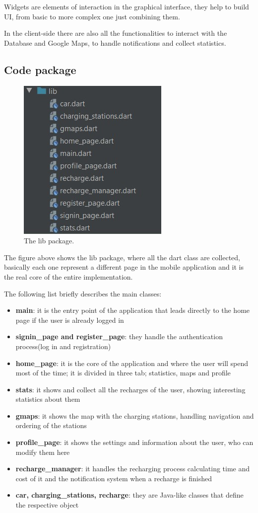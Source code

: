 Widgets are elements of interaction in the graphical interface, they help to build UI, from basic to more complex one just combining them. 

In the client-side there are also all the functionalities to interact with the Database and Google Maps, to handle notifications and collect statistics. 
\subsection{Code package}

\begin{figure}[htpb]
	\centering
	\includegraphics[width=0.4\linewidth]{Pics/code_package.jpg}
	\caption{The lib package.}%
	\label{fig:Pics/code_package}
\end{figure}

The figure above shows the lib package, where all the dart class are collected, basically each one represent a different page in the mobile application and it is the real core of the entire implementation.

The following list briefly describes the main classes: 
\begin{itemize}
	\item \textbf{main}: it is the entry point of the application that leads directly to the home page if the user is already logged in
	\item \textbf{signin\_page and register\_page}: they handle the authentication process(log in and registration)
	\item \textbf{home\_page}: it is the core of the application and where the user will spend most of the time; it is divided in three tab; statistics, maps and profile
	\item \textbf{stats}: it shows and collect all the recharges of the user, showing interesting statistics about them
	\item \textbf{gmaps}: it shows the map with the charging stations, handling navigation and ordering of the stations
	\item \textbf{profile\_page}: it shows the settings and information about the user, who can modify them here
	\item \textbf{recharge\_manager}: it handles the recharging process calculating time and cost of it and the notification system when a recharge is finished
	\item \textbf{car, charging\_stations, recharge}: they are Java-like classes that define the respective object
\end{itemize}

